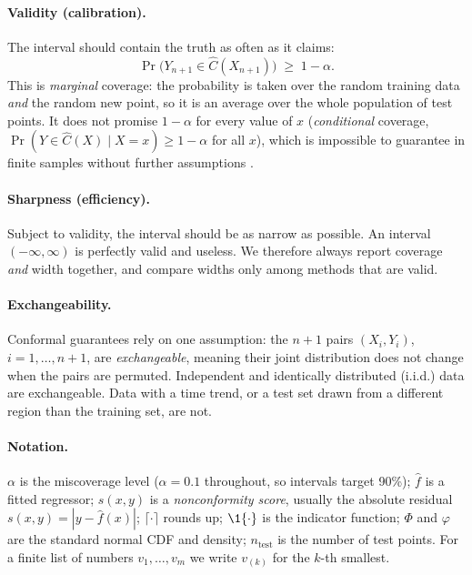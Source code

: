 \documentclass[11pt]{article}
\begin{document}
\paragraph{Validity (calibration).} The interval should contain the truth as often as it claims:
\begin{equation}\label{eq:marginal}
\Pr\big(Y_{n+1}\in\hat C(X_{n+1})\big)\;\ge\;1-\alpha .
\end{equation}
This is \emph{marginal} coverage: the probability is taken over the random training data \emph{and} the random new point, so it
is an average over the whole population of test points. It does not promise $1-\alpha$ for every value of $x$
(\emph{conditional} coverage, $\Pr(Y\in\hat C(X)\mid X=x)\ge1-\alpha$ for all $x$), which is impossible to guarantee
in finite samples without further assumptions \cite{lei2018distribution}.

\paragraph{Sharpness (efficiency).} Subject to validity, the interval should be as narrow as possible. An interval
$(-\infty,\infty)$ is perfectly valid and useless. We therefore always report coverage \emph{and} width
together, and compare widths only among methods that are valid.

\paragraph{Exchangeability.} Conformal guarantees rely on one assumption: the $n+1$ pairs
$(X_i,Y_i)$, $i=1,\dots,n+1$, are \emph{exchangeable}, meaning their joint distribution does not change when the
pairs are permuted. Independent and identically distributed (i.i.d.) data are exchangeable. Data with a time trend,
or a test set drawn from a different region than the training set, are not.

\paragraph{Notation.} $\alpha$ is the miscoverage level ($\alpha=0.1$ throughout, so intervals target 90\%);
$\hat f$ is a fitted regressor; $s(x,y)$ is a \emph{nonconformity score}, usually the absolute residual
$s(x,y)=|y-\hat f(x)|$; $\lceil\cdot\rceil$ rounds up; $\1\{\cdot\}$ is the indicator function; $\Phi$ and
$\varphi$ are the standard normal CDF and density; $n_{\text{test}}$ is the number of test points.
For a finite list of numbers $v_1,\dots,v_m$ we write $v_{(k)}$ for the $k$-th smallest.
\end{document}
